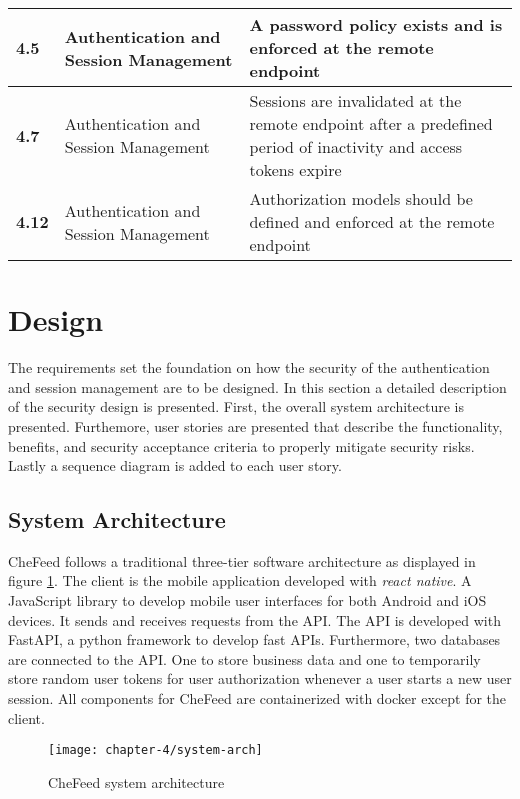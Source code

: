 \begin{table}[!h]
\begin{tabulary}{1.0\textwidth}{|l|L|L|}
        \hline
        \textbf{4.5} & Authentication and Session Management & A password policy exists and is enforced at the remote endpoint \\
        \hline
        \textbf{4.7} & Authentication and Session Management & Sessions are invalidated at the remote endpoint after a predefined period of inactivity and access tokens expire \\
        \hline
        \textbf{4.12} & Authentication and Session Management & Authorization models should be defined and enforced at the remote endpoint \\
        \hline
    \end{tabulary}
\end{table}

\section{Design}\label{sec-4:design}
The requirements set the foundation on how the security of the authentication and session management are to be designed. In this section a detailed description of the security design is presented. First, the overall system architecture is presented. Furthemore, user stories are presented that describe the functionality, benefits, and security acceptance criteria to properly mitigate security risks. Lastly a sequence diagram is added to each user story.

\subsection{System Architecture}
CheFeed follows a traditional three-tier software architecture as displayed in figure \ref{fig:sys-arch}. The client is the mobile application developed with \textit{react native}. A JavaScript library to develop mobile user interfaces for both Android and iOS devices. It sends and receives requests from the API. The API is developed with FastAPI, a python framework to develop fast APIs. Furthermore, two databases are connected to the API. One to store business data and one to temporarily store random user tokens for user authorization whenever a user starts a new user session. All components for CheFeed are containerized with docker except for the client.

\begin{figure}[!t]
    \caption{CheFeed system architecture}
    \label{fig:sys-arch}
    \texttt{[image: chapter-4/system-arch]}
\end{figure}


